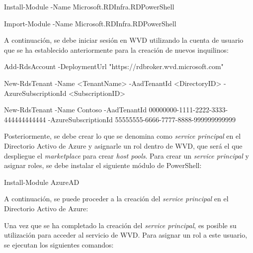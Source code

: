 \begin{console}
    Install-Module -Name Microsoft.RDInfra.RDPowerShell
\end{console} %

\begin{console}
    Import-Module -Name Microsoft.RDInfra.RDPowerShell
\end{console} %

A continuación, se debe iniciar sesión en \acs{WVD} utilizando la cuenta de usuario que se ha establecido anteriormente para la creación de nuevos inquilinos:

\begin{console}
    Add-RdsAccount -DeploymentUrl "https://rdbroker.wvd.microsoft.com"
\end{console} %

\begin{console}
    New-RdsTenant -Name <TenantName> -AadTenantId <DirectoryID> -AzureSubscriptionId <SubscriptionID>
\end{console} %

\begin{console}
    New-RdsTenant -Name Contoso -AadTenantId 00000000-1111-2222-3333-444444444444 -AzureSubscriptionId 55555555-6666-7777-8888-999999999999
\end{console} %

Posteriormente, se debe crear lo que se denomina como \textit{service principal} en el Directorio Activo de Azure y asignarle un rol dentro de \acs{WVD}, que será el que despliegue el \textit{marketplace} para crear \textit{host pools}. Para crear un \textit{service principal} y asignar roles, se debe instalar el siguiente módulo de PowerShell:

\begin{console}
    Install-Module AzureAD
\end{console} %

A continuación, se puede proceder a la creación del \textit{service principal} en el Directorio Activo de Azure:


Una vez que se ha completado la creación del \textit{service principal}, es posible su utilización para acceder al servicio de \acs{WVD}. Para asignar un rol a este usuario, se ejecutan los siguientes comandos:

